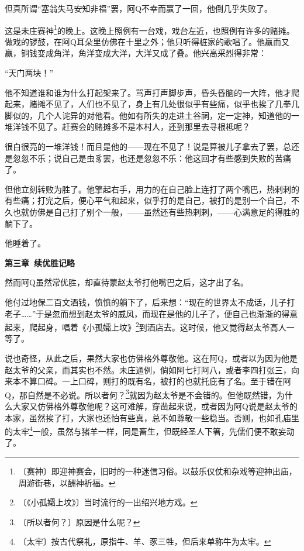 \documentclass[12pt,UTF-8,openany]{ctexbook}
\begin{document}
\begin{large}
    但真所谓“塞翁失马安知非福”罢，阿Q不幸而赢了一回，他倒几乎失败了。
    
    这是未庄赛神\footnote{〔赛神〕即迎神赛会，旧时的一种迷信习俗。以鼓乐仪仗和杂戏等迎神出庙，周游街巷，以酬神祈福。}的晚上。这晚上照例有一台戏，戏台左近，也照例有许多的赌摊。做戏的锣鼓，在阿Q耳朵里仿佛在十里之外；他只听得桩家的歌唱了。他赢而又赢，铜钱变成角洋，角洋变成大洋，大洋又成了叠。他兴高采烈得非常：
    
    “天门两块！”
    
    他不知道谁和谁为什么打起架来了。骂声打声脚步声，昏头昏脑的一大阵，他才爬起来，赌摊不见了，人们也不见了，身上有几处很似乎有些痛，似乎也挨了几拳几脚似的，几个人诧异的对他看。他如有所失的走进土谷祠，定一定神，知道他的一堆洋钱不见了。赶赛会的赌摊多不是本村人，还到那里去寻根柢呢？
    
    很白很亮的一堆洋钱！而且是他的——现在不见了！说是算被儿子拿去了罢，总还是忽忽不乐；说自己是虫豸罢，也还是忽忽不乐：他这回才有些感到失败的苦痛了。
    
    但他立刻转败为胜了。他擎起右手，用力的在自己脸上连打了两个嘴巴，热剌剌的有些痛；打完之后，便心平气和起来，似乎打的是自己，被打的是别一个自己，不久也就仿佛是自己打了别个一般，——虽然还有些热剌剌，——心满意足的得胜的躺下了。
    
    他睡着了。
    
    \begin{center}\textbf{第三章~续优胜记略}\end{center}
    
    然而阿Q虽然常优胜，却直待蒙赵太爷打他嘴巴之后，这才出了名。
    
    他付过地保二百文酒钱，愤愤的躺下了，后来想：“现在的世界太不成话，儿子打老子……”于是忽而想到赵太爷的威风，而现在是他的儿子了，便自己也渐渐的得意起来，爬起身，唱着《小孤孀上坟》\footnote{〔《小孤孀上坟》〕当时流行的一出绍兴地方戏。}到酒店去。这时候，他又觉得赵太爷高人一等了。
    
    说也奇怪，从此之后，果然大家也仿佛格外尊敬他。这在阿Q，或者以为因为他是赵太爷的父亲，而其实也不然。未庄通例，倘如阿七打阿八，或者李四打张三，向来本不算口碑。一上口碑，则打的既有名，被打的也就托庇有了名。至于错在阿Q，那自然是不必说。所以者何？\footnote{〔所以者何？〕原因是什么呢？}就因为赵太爷是不会错的。但他既然错，为什么大家又仿佛格外尊敬他呢？这可难解，穿凿起来说，或者因为阿Q说是赵太爷的本家，虽然挨了打，大家也还怕有些真，总不如尊敬一些稳当。否则，也如孔庙里的太牢\footnote{〔太牢〕按古代祭礼，原指牛、羊、豕三牲，但后来单称牛为太牢。}一般，虽然与猪羊一样，同是畜生，但既经圣人下箸，先儒们便不敢妄动了。
    

\end{large}
\end{document}

